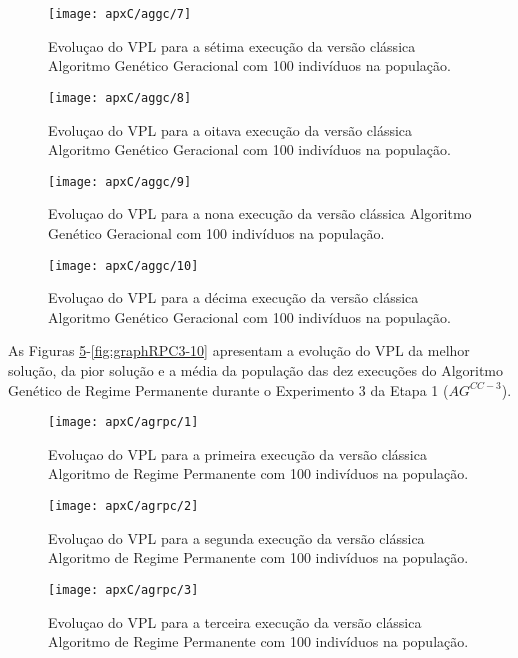 \begin{figure}[H]
\centering
\texttt{[image: apxC/aggc/7]}
\caption{Evoluçao do VPL para a sétima execução da versão clássica Algoritmo Genético Geracional com 100 indivíduos na população.}
\label{fig:graphGC3-07}
\end{figure}

\begin{figure}[H]
\centering
\texttt{[image: apxC/aggc/8]}
\caption{Evoluçao do VPL para a oitava execução da versão clássica Algoritmo Genético Geracional com 100 indivíduos na população.}
\label{fig:graphGC3-08}
\end{figure}

\begin{figure}[H]
\centering
\texttt{[image: apxC/aggc/9]}
\caption{Evoluçao do VPL para a nona execução da versão clássica Algoritmo Genético Geracional com 100 indivíduos na população.}
\label{fig:graphGC3-09}
\end{figure}

\begin{figure}[H]
\centering
\texttt{[image: apxC/aggc/10]}
\caption{Evoluçao do VPL para a décima execução da versão clássica Algoritmo Genético Geracional com 100 indivíduos na população.}
\label{fig:graphGC3-10}
\end{figure}

As Figuras \ref{fig:graphRPC3-01}-\ref{fig:graphRPC3-10} apresentam a evolução do VPL da melhor solução, da pior solução e a média da população das dez execuções do Algoritmo Genético de Regime Permanente durante o Experimento 3 da Etapa 1 ($AG^{CC-3}$).

\begin{figure}[H]
\centering
\texttt{[image: apxC/agrpc/1]}
\caption{Evoluçao do VPL para a primeira execução da versão clássica Algoritmo de Regime Permanente com 100 indivíduos na população.}
\label{fig:graphRPC3-01}
\end{figure}

\begin{figure}[H]
\centering
\texttt{[image: apxC/agrpc/2]}
\caption{Evoluçao do VPL para a segunda execução da versão clássica Algoritmo de Regime Permanente com 100 indivíduos na população.}
\label{fig:graphRPC3-02}
\end{figure}
\begin{figure}[H]
\centering

\texttt{[image: apxC/agrpc/3]}
\caption{Evoluçao do VPL para a terceira execução da versão clássica Algoritmo de Regime Permanente com 100 indivíduos na população.}
\label{fig:graphRPC3-03}
\end{figure}

